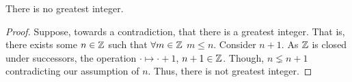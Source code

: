 \guard

\begin{prop}
\label{prop:integersAreUnbounded}
  There is no greatest integer.
\end{prop}
\begin{proof}
  Suppose, towards a contradiction, that there is a greatest integer.
  That is, there exists some $n\in\mathbb{Z}$ such that $\forall m\in\mathbb{Z}$ $m\leq n$.
  Consider $n+1$.
  As $\mathbb{Z}$ is closed under successors, the operation $\cdot\mapsto\cdot+1$, $n+1\in\mathbb{Z}$.
  Though, $n\lneq n+1$ contradicting our assumption of $n$.
  Thus, there is not greatest integer.
\end{proof}
